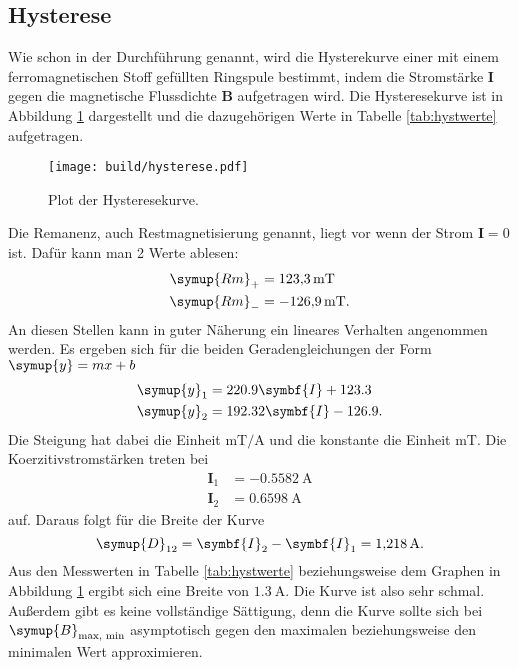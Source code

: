 \subsection{Hysterese}
Wie schon in der Durchführung genannt, wird die Hysterekurve einer mit einem
ferromagnetischen Stoff gefüllten Ringspule bestimmt, indem die Stromstärke
$\symbf{I}$ gegen die magnetische Flussdichte $\symbf{B}$ aufgetragen wird.
Die Hysteresekurve ist in Abbildung \ref{fig:hyst} dargestellt und die
dazugehörigen Werte in Tabelle \ref{tab:hystwerte} aufgetragen.
\begin{figure}
  \texttt{[image: build/hysterese.pdf]}
  \caption{Plot der Hysteresekurve.}
  \label{fig:hyst}
\end{figure}
Die Remanenz, auch Restmagnetisierung genannt, liegt vor wenn der Strom
$\symbf{I} = 0$ ist. Dafür kann man 2 Werte ablesen:
\begin{align*}
  \symup{Rm}_+ &= \SI{123.3}{\milli\tesla} \\
  \symup{Rm}_- &= \SI{-126.9}{\milli\tesla}.
\end{align*}
An diesen Stellen kann in guter Näherung ein lineares Verhalten angenommen
werden.
Es ergeben sich für die beiden Geradengleichungen der
Form $\symup{y} = mx + b$
\begin{align*}
  \symup{y}_1 &= 220.9\symbf{I} + 123.3 \\
  \symup{y}_2 &= 192.32\symbf{I} - 126.9.
\end{align*}
Die Steigung hat dabei die Einheit $\si{\milli\tesla\per\ampere}$ und die konstante
die Einheit $\si{\milli\tesla}$.
Die Koerzitivstromstärken treten bei
\begin{align*}
  \symbf{I}_1 &= \SI{-0.5582}{\ampere} \\
  \symbf{I}_2 &= \SI{0.6598}{\ampere}
\end{align*}
auf.
Daraus folgt für die Breite der Kurve
\begin{equation*}
  \symup{D}_{12} = \symbf{I}_2 - \symbf{I}_1 = \SI{1.218}{\ampere}.
\end{equation*}
Aus den Messwerten in Tabelle \ref{tab:hystwerte} beziehungsweise dem Graphen
in Abbildung \ref{fig:hyst} ergibt sich eine Breite von
$\SI{1.3}{\ampere}$.
Die Kurve ist also sehr schmal. Außerdem gibt es keine vollständige Sättigung,
denn die Kurve sollte sich bei $\symup{B}_\text{max, min}$ asymptotisch gegen
den maximalen beziehungsweise den minimalen Wert approximieren.
